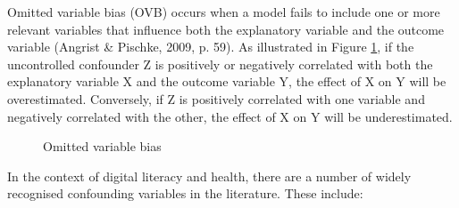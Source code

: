 Omitted variable bias (OVB) occurs when a model fails to include one or more relevant variables that influence both the explanatory variable and the outcome variable (Angrist \& Pischke, 2009, p. 59). As illustrated in Figure \ref{fig:ovb}, if the uncontrolled confounder Z is positively or negatively correlated with both the explanatory variable X and the outcome variable Y, the effect of X on Y will be overestimated. Conversely, if Z is positively correlated with one variable and negatively correlated with the other, the effect of X on Y will be underestimated. 

\begin{figure}[h!]
    \centering
    \caption{Omitted variable bias}
    \label{fig:ovb}
\end{figure}

In the context of digital literacy and health, there are a number of widely recognised confounding variables in the literature. These include:

